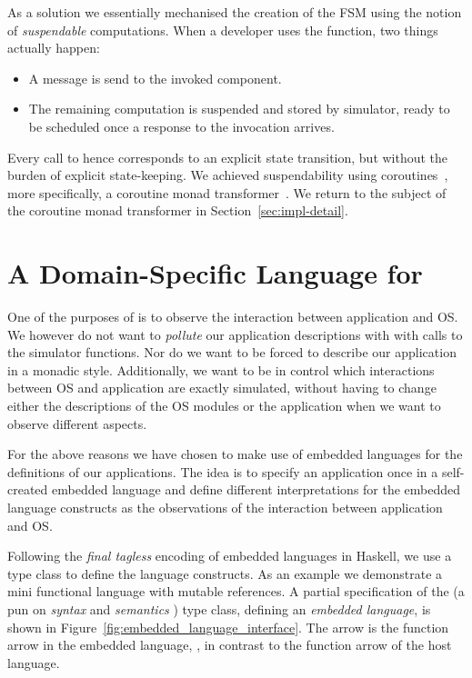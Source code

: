 As a solution we essentially mechanised the creation of the FSM using the notion of \emph{suspendable} computations.
When a developer uses the  function, two things actually happen:
\begin{itemize}
  \item A message is send to the invoked component.
  \item The remaining computation is suspended and stored by simulator, ready to be scheduled once a response to the invocation arrives.
\end{itemize}
Every call to  hence corresponds to an explicit state transition, but without the burden of explicit state-keeping.
We achieved suspendability using coroutines~\cite{coroutines}, more specifically, a coroutine monad transformer~\cite{cmt}.
We return to the subject of the coroutine monad transformer in Section~\ref{sec:impl-detail}.

\section{A Domain-Specific Language for \soosim}
\label{sec:dsl}
One of the purposes of \soosim is to observe the interaction between application and OS.
We however do not want to \emph{pollute} our application descriptions with with calls to the simulator functions.
Nor do we want to be forced to describe our application in a monadic style.
Additionally, we want to be in control which interactions between OS and application are exactly simulated, without having to change either the descriptions of the OS modules or the application when we want to observe different aspects.

For the above reasons we have chosen to make use of embedded languages for the definitions of our applications.
The idea is to specify an application once in a self-created embedded language and define different interpretations for the embedded language constructs as the observations of the interaction between application and OS\nolinebreak[3]  \cite{Hofer:2008:PED:1449913.1449935}.

Following the \emph{final tagless} \cite{final_tagless_embedding} encoding of embedded languages in Haskell, we use a type class to define the language constructs.
As an example we demonstrate a mini functional language with mutable references.
A partial specification of the  (a pun on \emph{syntax} and \emph{semantics} \cite{final_tagless_embedding}) type class, defining an \emph{embedded language}, is shown in Figure~\ref{fig:embedded_language_interface}.
The arrow \cd{:->} is the function arrow in the embedded language, \eg {}, in contrast to the function arrow \cd{->} of the host language.


